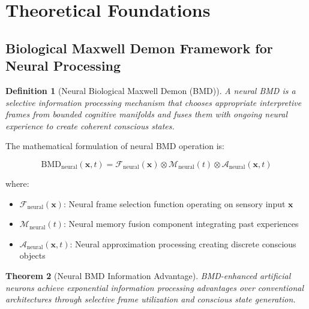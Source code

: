\documentclass[12pt,a4paper]{article}
\newtheorem{theorem}{Theorem}[section]
\newtheorem{definition}[theorem]{Definition}
\theoremstyle{remark}
\begin{document}
\section{Theoretical Foundations}

\subsection{Biological Maxwell Demon Framework for Neural Processing}

\begin{definition}[Neural Biological Maxwell Demon (BMD)]
A neural BMD is a selective information processing mechanism that chooses appropriate interpretive frames from bounded cognitive manifolds and fuses them with ongoing neural experience to create coherent conscious states.
\end{definition}

The mathematical formulation of neural BMD operation is:

\begin{equation}
\text{BMD}_{\text{neural}}(\mathbf{x}, t) = \mathcal{F}_{\text{neural}}(\mathbf{x}) \otimes \mathcal{M}_{\text{neural}}(t) \otimes \mathcal{A}_{\text{neural}}(\mathbf{x}, t)
\end{equation}

where:
\begin{itemize}
\item $\mathcal{F}_{\text{neural}}(\mathbf{x})$: Neural frame selection function operating on sensory input $\mathbf{x}$
\item $\mathcal{M}_{\text{neural}}(t)$: Neural memory fusion component integrating past experiences
\item $\mathcal{A}_{\text{neural}}(\mathbf{x}, t)$: Neural approximation processing creating discrete conscious objects
\end{itemize}

\begin{theorem}[Neural BMD Information Advantage]
BMD-enhanced artificial neurons achieve exponential information processing advantages over conventional architectures through selective frame utilization and conscious state generation.
\end{theorem}
\end{document}
